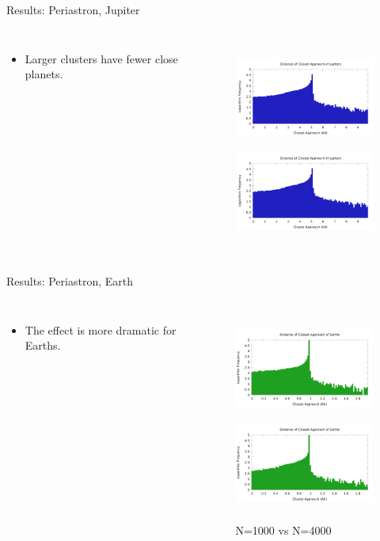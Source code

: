 \documentclass{beamer}
\begin{document}
\begin{frame}{Results: Periastron, Jupiter}
    \begin{columns}
        \begin{itemize}
            \item Larger clusters have fewer close planets.
        \end{itemize}
        \begin{figure}
            \includegraphics[height=1.20in]{periastron_jupiter_1000.png} \\
            \includegraphics[height=1.20in]{periastron_jupiter_4000.png}
        \end{figure}
    \end{columns}
\end{frame}

\begin{frame}{Results: Periastron, Earth}
    \begin{columns}
        \begin{itemize}
            \item The effect is more dramatic for Earths.
        \end{itemize}
        \begin{figure}
            \centering
            \caption{N=1000 vs N=4000}
            \includegraphics[height=1.20in]{periastron_earth_1000.png} \\
            \includegraphics[height=1.20in]{periastron_earth_4000.png}
        \end{figure}
    \end{columns}
\end{frame}
\end{document}
